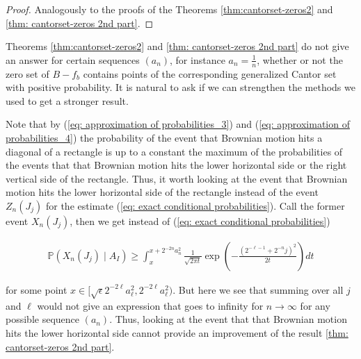 \documentclass[11pt,reqno]{amsart}
\theoremstyle{plain}
\theoremstyle{definition}
\theoremstyle{remark}
\begin{document}
\begin{proof}
Analogously to the proofs of the Theorems \ref{thm:cantorset-zeros2} and \ref{thm: cantorset-zeros 2nd part}.
\end{proof}

Theorems \ref{thm:cantorset-zeros2} and \ref{thm: cantorset-zeros 2nd part} do not give an answer for certain sequences $(a_n)$, for instance $a_n=\frac{1}{n}$, whether or not the zero set of $B-f_b$ contains points of the corresponding generalized Cantor set with positive probability. It is natural to ask if we can strengthen the methods we used to get a stronger result.

Note that by (\ref{eq: approximation of probabilities_3}) and (\ref{eq: approximation of probabilities_4}) the probability of the event that Brownian motion hits a diagonal of a rectangle is up to a constant the maximum of the probabilities of the events that that Brownian motion hits the lower horizontal side or the right vertical side of the rectangle. Thus, it worth looking at the event that Brownian motion hits the lower horizontal side of the rectangle instead of the event $Z_n(J_j)$ for the estimate (\ref{eq: exact conditional probabilities}). Call the former event $X_n(J_j)$, then we get instead of (\ref{eq: exact conditional probabilities})

\begin{align*}
\mathbb{P}(X_n(J_j) \mid A_I)  \geq \int_{x}^{x+ 2^{-2n} a_n^2} \frac{1}{\sqrt{2\pi t}}\exp (-\frac{{(2^{-\ell-1} + 2^{-n}j)}^2}{2t}) dt
\end{align*}

for some point $x \in [\sqrt{\epsilon}2^{-2\ell} a_\ell^2, 2^{-2\ell} a_\ell^2)$. But here we see that summing over all $j$ and $\ell$ would not give an expression that goes to infinity for $n \rightarrow \infty$ for any possible sequence $(a_n)$. Thus, looking at the event that that Brownian motion hits the lower horizontal side cannot provide an improvement of the result \ref{thm: cantorset-zeros 2nd part}.
\end{document}
